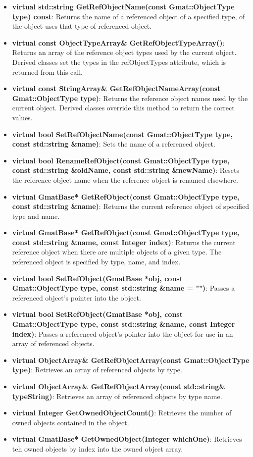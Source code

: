 \begin{itemize}
\item \textbf{virtual std::string GetRefObjectName(const Gmat::ObjectType type) const}: Returns the
name of a referenced object of a specified type, of the object uses that type of referenced object.
\item \textbf{virtual const ObjectTypeArray\& GetRefObjectTypeArray()}: Returns an array of the
reference object types used by the current object.  Derived classes set the types in the
refObjectTypes attribute, which is returned from this call.
\item \textbf{virtual const StringArray\& GetRefObjectNameArray(const Gmat::ObjectType type)}:
Returns the reference object names used by the current object.  Derived classes override this
method to return the correct values.
\item \textbf{virtual bool SetRefObjectName(const Gmat::ObjectType type, const std::string
\&name)}: Sets the name of a referenced object.
\item \textbf{virtual bool RenameRefObject(const Gmat::ObjectType type, const std::string \&oldName,
const std::string \&newName)}: Resets the reference object name when the reference object is
renamed elsewhere.
\item \textbf{virtual GmatBase* GetRefObject(const Gmat::ObjectType type, const std::string
\&name)}: Returns the current reference object of specified type and name.
\item \textbf{virtual GmatBase* GetRefObject(const Gmat::ObjectType type, const std::string \&name,
const Integer index)}: Returns the current reference object when there are multiple objects of a
given type.  The referenced object is specified by type, name, and index.
\item \textbf{virtual bool SetRefObject(GmatBase *obj, const Gmat::ObjectType type, const
std::string \&name = "")}: Passes a referenced object's pointer into the object.
\item \textbf{virtual bool SetRefObject(GmatBase *obj, const Gmat::ObjectType type, const
std::string \&name, const Integer index)}: Passes a referenced object's pointer into the object for
use in an array of referenced objects.
\item \textbf{virtual ObjectArray\& GetRefObjectArray(const Gmat::ObjectType type)}: Retrieves an
array of referenced objects by type.
\item \textbf{virtual ObjectArray\& GetRefObjectArray(const std::string\& typeString)}: Retrieves an
array of referenced objects by type name.
\item \textbf{virtual Integer GetOwnedObjectCount()}: Retrieves the number of owned objects
contained in the object.
\item \textbf{virtual GmatBase* GetOwnedObject(Integer whichOne)}: Retrieves teh owned objects by
index into the owned object array.
\end{itemize}

